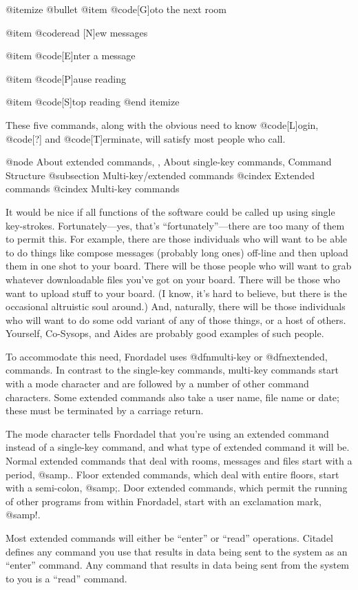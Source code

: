 @itemize @bullet
@item
@code{[G]oto the next room}

@item
@code{read [N]ew messages}

@item
@code{[E]nter a message}

@item
@code{[P]ause reading}

@item
@code{[S]top reading}
@end itemize

These five commands, along with the obvious need to
know @code{[L]ogin}, @code{[?]} and @code{[T]erminate}, will satisfy most
people who call.

@node About extended commands,  , About single-key commands, Command Structure
@subsection Multi-key/extended commands
@cindex Extended commands
@cindex Multi-key commands

It would be nice if all functions of the software
could be called up using single key-strokes.  Fortunately---yes, that's
``fortunately''---there
are too many of them to permit this.  For example,
there are those individuals who will want to be able to do
things like compose messages (probably long ones) off-line
and then upload them in one shot to your board.  There
will be those people who will want to grab whatever
downloadable files you've got on your board.  There will be
those who want to upload stuff to your board.  (I know, it's
hard to believe, but there is the occasional altruistic soul
around.)  And, naturally, there will be those individuals
who will want to do some odd variant of any of those things,
or a host of others.  Yourself, Co-Sysops, and Aides are
probably good examples of such people.

To accommodate this need, Fnordadel uses @dfn{multi-key}
or @dfn{extended}, commands.  In contrast to the single-key
commands, multi-key commands start with a mode character
and are followed by a number of other command characters.
Some extended commands also take a user name, file name or
date; these must be terminated by a carriage return.

The mode character tells Fnordadel that you're
using an extended command instead of a single-key command,
and what type of extended command it will be.  Normal
extended commands that deal with rooms, messages and files
start with a period, @samp{.}.  Floor extended commands, which
deal with entire floors, start with a semi-colon, @samp{;}.
Door extended commands, which permit the running of other
programs from within Fnordadel, start with an exclamation
mark, @samp{!}.

Most extended commands will either be ``enter'' or
``read'' operations.  Citadel defines any command you use
that results in data being sent to the system as an
``enter'' command.  Any command that results in data being
sent from the system to you is a ``read'' command.


